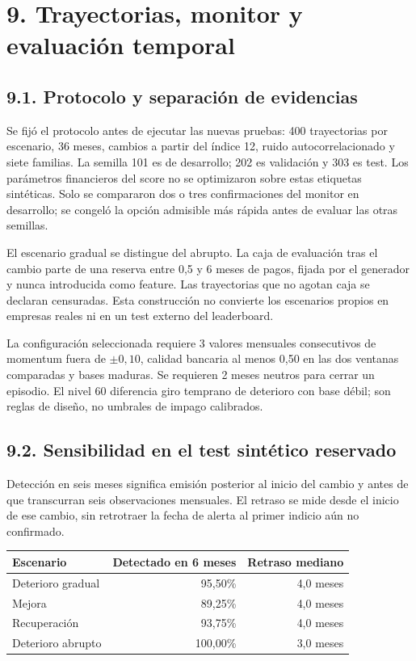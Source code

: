 \section*{9. Trayectorias, monitor y evaluación temporal}
\subsection*{9.1. Protocolo y separación de evidencias}
Se fijó el protocolo antes de ejecutar las nuevas pruebas: 400 trayectorias por escenario, 36 meses, cambios a partir del índice 12, ruido autocorrelacionado y siete familias. La semilla 101 es de desarrollo; 202 es validación y 303 es test. Los parámetros financieros del score no se optimizaron sobre estas etiquetas sintéticas. Solo se compararon dos o tres confirmaciones del monitor en desarrollo; se congeló la opción admisible más rápida antes de evaluar las otras semillas.

El escenario gradual se distingue del abrupto. La caja de evaluación tras el cambio parte de una reserva entre 0,5 y 6 meses de pagos, fijada por el generador y nunca introducida como feature. Las trayectorias que no agotan caja se declaran censuradas. Esta construcción no convierte los escenarios propios en empresas reales ni en un test externo del leaderboard.

La configuración seleccionada requiere 3 valores mensuales consecutivos de momentum fuera de $\pm 0,10$, calidad bancaria al menos 0,50 en las dos ventanas comparadas y bases maduras. Se requieren 2 meses neutros para cerrar un episodio. El nivel 60 diferencia giro temprano de deterioro con base débil; son reglas de diseño, no umbrales de impago calibrados.

\subsection*{9.2. Sensibilidad en el test sintético reservado}
Detección en seis meses significa emisión posterior al inicio del cambio y antes de que transcurran seis observaciones mensuales. El retraso se mide desde el inicio de ese cambio, sin retrotraer la fecha de alerta al primer indicio aún no confirmado.

\begin{center}
\small
\begin{tabular}{lrr}
\hline
Escenario & Detectado en 6 meses & Retraso mediano \\
\hline
Deterioro gradual & 95,50\% & 4,0 meses \\
Mejora & 89,25\% & 4,0 meses \\
Recuperación & 93,75\% & 4,0 meses \\
Deterioro abrupto & 100,00\% & 3,0 meses \\
\hline
\end{tabular}
\end{center}

